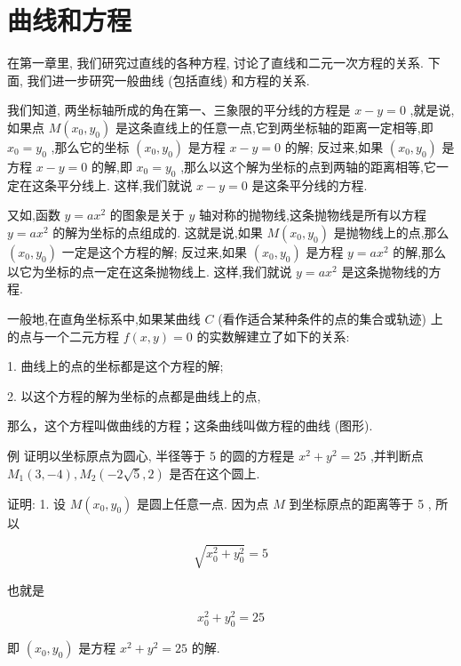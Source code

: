 \documentclass[lang=cn,newtx,10pt,scheme=chinese]{elegantbook}
\begin{document}
\section{曲线和方程}

在第一章里, 我们研究过直线的各种方程, 讨论了直线和二元一次方程的关系. 下面, 我们进一步研究一般曲线 (包括直线) 和方程的关系.

我们知道, 两坐标轴所成的角在第一、三象限的平分线的方程是 \(x - y = 0\) ,就是说,如果点 \(M\left( {{x}_{0},{y}_{0}}\right)\) 是这条直线上的任意一点,它到两坐标轴的距离一定相等,即 \({x}_{0} = {y}_{0}\) ,那么它的坐标 \(\left( {{x}_{0},{y}_{0}}\right)\) 是方程 \(x - y = 0\) 的解; 反过来,如果 \(\left( {{x}_{0},{y}_{0}}\right)\) 是方程 \(x - y = 0\) 的解,即 \({x}_{0} = {y}_{0}\) ,那么以这个解为坐标的点到两轴的距离相等,它一定在这条平分线上. 这样,我们就说 \(x - y = 0\) 是这条平分线的方程.

又如,函数 \(y = a{x}^{2}\) 的图象是关于 \(y\) 轴对称的抛物线,这条抛物线是所有以方程 \(y = a{x}^{2}\) 的解为坐标的点组成的. 这就是说,如果 \(M\left( {{x}_{0},{y}_{0}}\right)\) 是抛物线上的点,那么 \(\left( {{x}_{0},{y}_{0}}\right)\) 一定是这个方程的解; 反过来,如果 \(\left( {{x}_{0},{y}_{0}}\right)\) 是方程 \(y = a{x}^{2}\) 的解,那么以它为坐标的点一定在这条抛物线上. 这样,我们就说 \(y = a{x}^{2}\) 是这条抛物线的方程.


\begin{corollary}[曲线和方程的关系]	
一般地,在直角坐标系中,如果某曲线 \(C\) (看作适合某种条件的点的集合或轨迹) 上的点与一个二元方程 \(f\left( {x,y}\right) = 0\) 的实数解建立了如下的关系:

1. 曲线上的点的坐标都是这个方程的解;

2. 以这个方程的解为坐标的点都是曲线上的点,

那么，这个方程叫做曲线的方程；这条曲线叫做方程的曲线 (图形).
\end{corollary}
例 证明以坐标原点为圆心, 半径等于 5 的圆的方程是 \({x}^{2} + {y}^{2} = {25}\) ,并判断点 \({M}_{1}\left( {3, - 4}\right) ,{M}_{2}\left( {-2\sqrt{5},2}\right)\) 是否在这个圆上.

证明: 1. 设 \(M\left( {{x}_{0},{y}_{0}}\right)\) 是圆上任意一点. 因为点 \(M\) 到坐标原点的距离等于 5 , 所以

\[
  \sqrt{{x}_{0}^{2} + {y}_{0}^{2}} = 5
\]

也就是

\[
    {x}_{0}^{2} + {y}_{0}^{2} = {25}
\]

即 \(\left( {{x}_{0},{y}_{0}}\right)\) 是方程 \({x}^{2} + {y}^{2} = {25}\) 的解.
\end{document}
